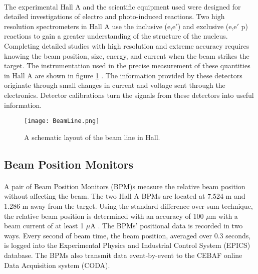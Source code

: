 	 \paragraph{}The experimental Hall A and the scientific equipment used were designed for detailed investigations of electro and photo-induced reactions. Two high resolution spectrometers in Hall A use the inclusive (e,e$\prime$) and exclusive (e,e$\prime$ p) reactions to gain a greater understanding of the structure of the nucleus. Completing detailed studies with high resolution and extreme accuracy requires knowing the beam position, size, energy, and current when the beam strikes the target. The instrumentation used in the precise measurement of these quantities in Hall A  are shown in figure \ref{BeamLine} \cite{HallA}. The information provided by these detectors originate through small changes in current and voltage sent through the electronics. Detector calibrations turn the signals from these detectors into useful information.
	 
	 \begin{figure}[t]
	 	\centering
	 	\texttt{[image: BeamLine.png]} 
	 		 	\caption{A schematic layout of the beam line in Hall. \cite{HallA} }
	 	\label{BeamLine}
	 \end{figure} 	
	 
 
	 \subsection{Beam Position Monitors}
	 \paragraph{} A pair of Beam Position Monitors (BPM)s measure the relative beam position without affecting the beam. The two Hall A BPMs are located at 7.524 m and 1.286 m away from the target. Using the standard difference-over-sum technique, the relative beam position is determined with an accuracy of 100 $\mu$m with a beam current of at least 1 $\mu$A \cite{HallA}. The BPMs' positional data is recorded in two ways. Every second of beam time, the beam position, averaged over 0.3 seconds, is logged into the Experimental Physics and Industrial Control System (EPICS) database. The BPMs also transmit data event-by-event to the CEBAF online Data Acquisition system (CODA).
	 	 	 

